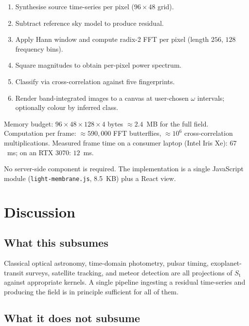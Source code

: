 \documentclass[11pt,twocolumn,a4paper]{article}
\theoremstyle{definition}
\theoremstyle{remark}
\newcommand{\Sfield}{S_{\mathrm{t}}}
\begin{document}
\begin{enumerate}[nosep]
\item Synthesise source time-series per pixel ($96 \times 48$ grid).
\item Subtract reference sky model to produce residual.
\item Apply Hann window and compute radix-2 FFT per pixel (length
$256$, $128$ frequency bins).
\item Square magnitudes to obtain per-pixel power spectrum.
\item Classify via cross-correlation against five fingerprints.
\item Render band-integrated images to a canvas at user-chosen
$\omega$ intervals; optionally colour by inferred class.
\end{enumerate}

Memory budget: $96 \times 48 \times 128 \times 4$ bytes
$\approx 2.4$~MB for the full field. Computation per frame:
$\approx 590{,}000$ FFT butterflies, $\approx 10^6$ cross-correlation
multiplications. Measured frame time on a consumer laptop (Intel Iris
Xe): $67$~ms; on an RTX 3070: $12$~ms.

No server-side component is required. The implementation is a single
JavaScript module (\texttt{light-membrane.js}, 8.5~KB) plus a React
view.

\section{Discussion}
\label{sec:discussion}

\subsection{What this subsumes}

Classical optical astronomy, time-domain photometry, pulsar timing,
exoplanet-transit surveys, satellite tracking, and meteor detection
are all projections of $\Sfield$ against appropriate kernels. A single
pipeline ingesting a residual time-series and producing the field is
in principle sufficient for all of them.

\subsection{What it does not subsume}
\end{document}
